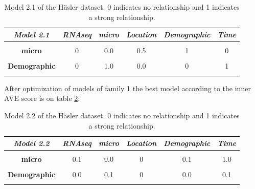 \documentclass[
  12pt,
  a4paper,
  twoside,
  openright]{book}
\begin{document}
\begin{table}[H]

\caption[Model 2.1 of the Häsler dataset.]{\label{tab:hasler-model-2-1}Model 2.1 of the Häsler dataset. 0 indicates no relationship and 1 indicates a strong relationship.}
\centering
\begin{tabular}[t]{|>{}c|c|c|c|c|>{}c|}
\hline
\em{\textbf{Model 2.1}} & \em{\textbf{RNAseq}} & \em{\textbf{micro}} & \em{\textbf{Location}} & \em{\textbf{Demographic}} & \em{\textbf{Time}}\\
\hline
\textbf{\cellcolor{gray!6}{RNAseq}} & \cellcolor{gray!6}{0} & \cellcolor{gray!6}{0.0} & \cellcolor{gray!6}{1.0} & \cellcolor{gray!6}{0} & \cellcolor{gray!6}{0}\\
\hline
\textbf{micro} & 0 & 0.0 & 0.5 & 1 & 0\\
\hline
\textbf{\cellcolor{gray!6}{Location}} & \cellcolor{gray!6}{1} & \cellcolor{gray!6}{0.5} & \cellcolor{gray!6}{0.0} & \cellcolor{gray!6}{0} & \cellcolor{gray!6}{0}\\
\hline
\textbf{Demographic} & 0 & 1.0 & 0.0 & 0 & 1\\
\hline
\textbf{\cellcolor{gray!6}{Time}} & \cellcolor{gray!6}{0} & \cellcolor{gray!6}{0.0} & \cellcolor{gray!6}{0.0} & \cellcolor{gray!6}{1} & \cellcolor{gray!6}{0}\\
\hline
\end{tabular}
\end{table}

After optimization of models of family 1 the best model according to the inner AVE score is on table \ref{tab:hasler-model-2-2}:

\begin{table}[H]

\caption[Model 2.2 of the Häsler dataset.]{\label{tab:hasler-model-2-2}Model 2.2 of the Häsler dataset. 0 indicates no relationship and 1 indicates a strong relationship.}
\centering
\begin{tabular}[t]{|>{}c|c|c|c|c|>{}c|}
\hline
\em{\textbf{Model 2.2}} & \em{\textbf{RNAseq}} & \em{\textbf{micro}} & \em{\textbf{Location}} & \em{\textbf{Demographic}} & \em{\textbf{Time}}\\
\hline
\textbf{\cellcolor{gray!6}{RNAseq}} & \cellcolor{gray!6}{0.0} & \cellcolor{gray!6}{0.1} & \cellcolor{gray!6}{1} & \cellcolor{gray!6}{0.0} & \cellcolor{gray!6}{0.0}\\
\hline
\textbf{micro} & 0.1 & 0.0 & 0 & 0.1 & 1.0\\
\hline
\textbf{\cellcolor{gray!6}{Location}} & \cellcolor{gray!6}{1.0} & \cellcolor{gray!6}{0.0} & \cellcolor{gray!6}{0} & \cellcolor{gray!6}{0.0} & \cellcolor{gray!6}{0.0}\\
\hline
\textbf{Demographic} & 0.0 & 0.1 & 0 & 0.0 & 0.1\\
\hline
\textbf{\cellcolor{gray!6}{Time}} & \cellcolor{gray!6}{0.0} & \cellcolor{gray!6}{1.0} & \cellcolor{gray!6}{0} & \cellcolor{gray!6}{0.1} & \cellcolor{gray!6}{0.0}\\
\hline
\end{tabular}
\end{table}
\end{document}
